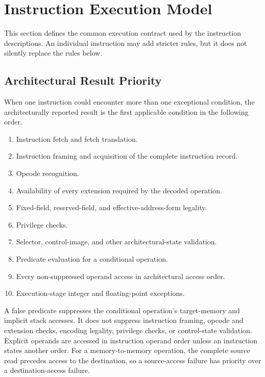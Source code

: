 \clearpage
\section{Instruction Execution Model}\label{page:instruction-execution-model}

This section defines the common execution contract used by the instruction descriptions. An individual
instruction may add stricter rules, but it does not silently replace the rules below.

\subsection{Architectural Result Priority}
When one instruction could encounter more than one exceptional condition, the architecturally reported result is
the first applicable condition in the following order.

\begin{enumerate}
\item Instruction fetch and fetch translation.
\item Instruction framing and acquisition of the complete instruction record.
\item Opcode recognition.
\item Availability of every extension required by the decoded operation.
\item Fixed-field, reserved-field, and effective-address-form legality.
\item Privilege checks.
\item Selector, control-image, and other architectural-state validation.
\item Predicate evaluation for a conditional operation.
\item Every non-suppressed operand access in architectural access order.
\item Execution-stage integer and floating-point exceptions.
\end{enumerate}

A false predicate suppresses the conditional operation's target-memory and implicit stack accesses. It does not
suppress instruction framing, opcode and extension checks, encoding legality, privilege checks, or control-state
validation. Explicit operands are accessed in instruction operand order unless an instruction states another order.
For a memory-to-memory operation, the complete source read precedes access to the destination, so a source-access
failure has priority over a destination-access failure.

